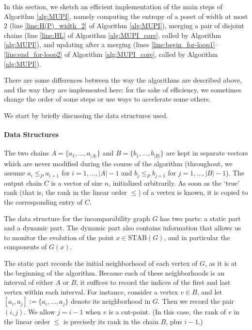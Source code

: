 \documentclass{article} \usepackage{fullpage}
\newcommand{\STAB}{\mathrm{STAB}}
\begin{document}
In this section, we sketch an efficient implementation of the main steps of Algorithm \ref{alg:MUPI}, namely computing the entropy of a poset of width at most $2$ (line \ref{line:H(P)_width_2} of Algorithm \ref{alg:MUPI}), merging a pair of disjoint chains (line \ref{line:HL} of Algorithm \ref{alg:MUPI_core}, called by Algorithm \ref{alg:MUPI}), and updating after a merging (lines \ref{line:begin_for-loop1}--\ref{line:end_for-loop2} of Algorithm \ref{alg:MUPI_core}, called by Algorithm \ref{alg:MUPI}). 

There are some differences between the way the algorithms are described above, and the way they are implemented here: for the sake of efficiency, we sometimes change the order of some steps or use ways to accelerate some others. 

We start by briefly discussing the data structures used.
 
\paragraph*{Data Structures} 

The two chains $A = \{a_1,\ldots,a_{|A|}\}$ and $B = \{b_1,\ldots,b_{|B|}\}$ are kept in separate vectors which are never modified during the course of the algorithm (throughout, we assume $a_{i} \leqslant_P a_{i+1}$ for $i = 1, \ldots, |A|-1$ and $b_{j} \leqslant_P b_{j+1}$ for $j = 1, \ldots, |B|-1$). The output chain $C$ is a vector of size $n$, initialized arbitrarily. As soon as the `true' rank (that is, the rank in the linear order $\leqslant$) of a vertex is known, it is copied to the corresponding entry of $C$.

The data structure for the incomparability graph $G$ has two parts: a static part and a dynamic part. The dynamic part also contains information that allows us to monitor the evolution of the point $x \in \STAB(G)$, and in particular the components of $G(x)$.

The static part records the initial neighborhood of each vertex of $G$, as it is at the beginning of the algorithm. Because each of these neighborhoods is an interval of either $A$ or $B$, it suffices to record the indices of the first and last vertex within each interval. For instance, consider a vertex $v \in B$, and let $[a_i,a_j] := \{a_i,\ldots,a_j\}$ denote its neighborhood in $G$. Then we record the pair $(i,j)$. We allow $j = i-1$ when $v$ is a cut-point. (In this case, the rank of $v$ in the linear order $\leqslant$ is precisely its rank in the chain $B$, plus $i-1$.)
\end{document}
